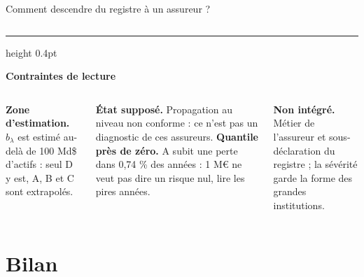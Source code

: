 \documentclass[aspectratio=169,10pt,t]{beamer}
\begin{document}
\begin{frame}[label=descente-entite]{Comment descendre du registre à un assureur ?}
\begin{columns}[T,onlytextwidth]
  \end{columns}
  \vspace{1mm}
  {\color{accent}\hrule height 0.4pt}\vspace{1mm}
  \footnotesize\textbf{\color{accent}Contraintes de lecture}\par\vspace{0.5mm}
  \begin{columns}[T,onlytextwidth]
  \scriptsize
  \textbf{Zone d'estimation.} $b_\lambda$ est estimé au-delà de 100 Md\$ d'actifs : seul D y est, A, B et C sont extrapolés.\par\vspace{1mm}
  \textbf{État supposé.} Propagation au niveau non conforme : ce n'est pas un diagnostic de ces assureurs.
  \scriptsize
  \textbf{Quantile près de zéro.} A subit une perte dans 0,74 \% des années : 1 M€ ne veut pas dire un risque nul, lire les pires années.\par\vspace{1mm}
  \textbf{Non intégré.} Métier de l'assureur et sous-déclaration du registre ; la sévérité garde la forme des grandes institutions.
  \end{columns}
\end{frame}



\section{Bilan}
\end{document}
